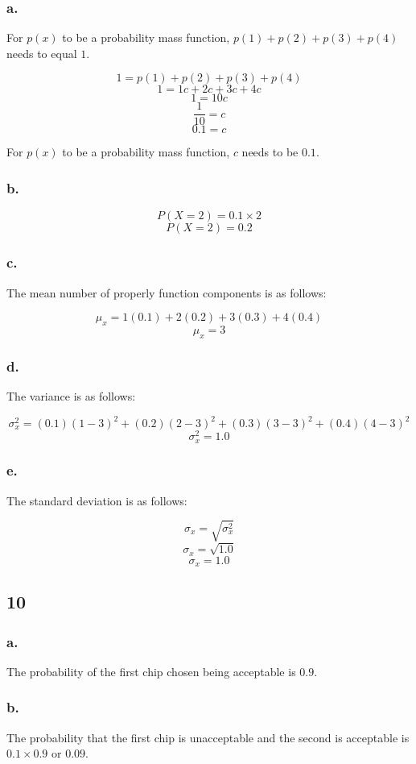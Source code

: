 \documentclass[11pt]{article}
\begin{document}
\subsubsection*{a.}
For $p(x)$ to be a probability mass function, $p(1)+p(2)+p(3)+p(4)$ needs to
equal $1$. 

\[ 1 = p(1)+p(2)+p(3)+p(4) \]
\[ 1 = 1c+2c+3c+4c \]
\[ 1 = 10c \]
\[ \frac{1}{10} = c \]
\[ 0.1 = c \]

For $p(x)$ to be a probability mass function, $c$ needs to be $0.1$. 

\subsubsection*{b.}
\[ P(X=2) = 0.1 \times 2 \]
\[ P(X=2) = 0.2 \]

\subsubsection*{c.}
The mean number of properly function components is as follows:

\[ \mu_x = 1(0.1)+2(0.2)+3(0.3)+4(0.4) \]
\[ \mu_x = 3 \]

\subsubsection*{d.}
The variance is as follows:

\[ \sigma_x^2 = (0.1){(1-3)}^2 + (0.2){(2-3)}^2 + (0.3){(3-3)}^2 + (0.4){(4-3)}^2 \]
\[ \sigma_x^2 = 1.0 \]

\subsubsection*{e.}
The standard deviation is as follows:

\[ \sigma_x = \sqrt{\sigma_x^2} \]
\[ \sigma_x = \sqrt{1.0} \]
\[ \sigma_x = 1.0 \]

\subsection*{10}
\subsubsection*{a.}
The probability of the first chip chosen being acceptable is $0.9$. 

\subsubsection*{b.}
The probability that the first chip is unacceptable and the second is acceptable
is $0.1 \times 0.9$ or $0.09$. 
\end{document}
